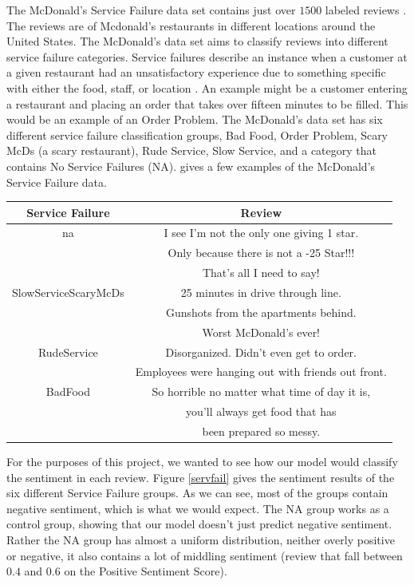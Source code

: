 \documentclass[titlepage,letterpaper]{article}
\begin{document}
The McDonald's Service Failure data set contains just over $1500$ labeled reviews \cite{McDonalds}. The reviews are of Mcdonald's restaurants in different locations around the United States. The McDonald's data set aims to classify reviews into different service failure categories. Service failures describe an instance when a customer at a given restaurant had an unsatisfactory experience due to something specific with either the food, staff, or location \cite{McDonalds}. An example might be a customer entering a restaurant and placing an order that takes over fifteen minutes to be filled. This would be an example of an Order Problem. The McDonald's data set has six different service failure classification groups, Bad Food, Order Problem, Scary McDs (a scary restaurant), Rude Service, Slow Service, and a category that contains No Service Failures (NA).   gives a few examples of the McDonald's Service Failure data. 

\begin{table}
 \begin{center}
	\centering
	\begin{tabular}{ |c|c| } 
		\hline
		Service Failure & Review \\
		\hline \hline
		na & I see I'm not the only one giving 1 star. \\
		 & Only because there is not a -25 Star!!! \\
		  & That's all I need to say! \\
		\hline
		SlowServiceScaryMcDs &  25 minutes in drive through line. \\
		& Gunshots from the apartments behind. \\
		& Worst McDonald's ever! \\
		\hline
		RudeService & Disorganized. Didn't even get to order. \\
		& Employees were hanging out with friends out front.  \\ 
		\hline
		BadFood & So horrible no matter what time of day it is, \\
		& you'll always get food that has \\ 
		& been prepared so messy. \\
		\hline
	\end{tabular}
	\label{McdonaldsServiceFailureTable}
\end{center}
\end{table}
For the purposes of this project, we wanted to see how our model would classify the sentiment in each review. Figure \ref{servfail} gives the sentiment results of the six different Service Failure groups. As we can see, most of the groups contain negative sentiment, which is what we would expect. The NA group works as a control group, showing that our model doesn't just predict negative sentiment. Rather the NA group has almost a uniform distribution, neither overly positive or negative, it also contains a lot of middling sentiment (review that fall between $0.4$ and $0.6$ on the Positive Sentiment Score).
\end{document}
